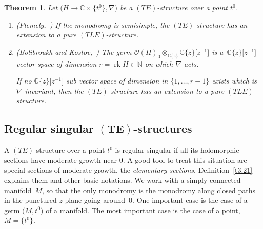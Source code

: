 \documentclass[10pt,a4paper]{amsart}
\numberwithin{equation}{section}
\numberwithin{figure}{section}
\newcommand{\N}{{\mathbb N}}
\newcommand{\C}{{\mathbb C}}
\newcommand{\OO}{{\mathcal O}}
\newcommand{\nnn}{\nabla}
\DeclareMathOperator{\rk}{rk}
\newtheorem{Theorem}{Theorem}[section]
\begin{document}
\begin{Theorem}\label{t3.20}
Let $\big(H\to\C\times\big\{t^0\big\},\nnn\big)$ be a $(TE)$-structure
over a point $t^0$.
\begin{enumerate}\itemsep=0pt
\item[$(a)$] {\rm (Plemely,~\cite[Chapter~IV, Corollary~2.6(1)]{Sa02})}
If the monodromy is semisimple, the $(TE)$-structure
has an extension to a pure $(TLE)$-structure.

\item[$(b)$] {\rm (Bolibroukh and Kostov,~\cite[Chapter~IV, Corollary 2.6(3)]{Sa02})}
The germ $\OO(H)_0\otimes_{\C\{z\}}\C\{z\}\big[z^{-1}\big]$ is a~$\C\{z\}\big[z^{-1}\big]$-vector space of dimension $r=\rk H\in\N$
on which $\nnn$ acts.

If no $\C\{z\}\big[z^{-1}\big]$ sub vector space of dimension
in $\{1,\dots ,r-1\}$ exists which is $\nnn$-invariant,
then the $(TE)$-structure has an extension to a
pure $(TLE)$-structure.
\end{enumerate}
\end{Theorem}

\subsection[Regular singular $(TE)$-structures]{Regular singular $\boldsymbol{(TE)}$-structures}%


A $(TE)$-structure over a point $t^0$ is regular singular
if all its holomorphic sections have moderate growth
near 0. A good tool to treat this situation are
special sections of moderate growth, the
{\it elementary sections}.
Definition~\ref{t3.21} explains them and other basic notations.
We work with a simply connected manifold~$M$,
so that the only monodromy is the monodromy along closed
paths in the punctured $z$-plane going around~0.
One important case is the case of a germ $\big(M,t^0\big)$
of a manifold.
The most important case is the case of a point, $M=\big\{t^0\big\}$.
\end{document}
